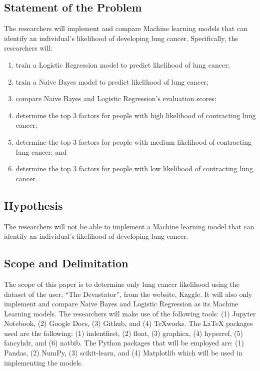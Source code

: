 \documentclass[runningheads]{llncs}
\begin{document}
\subsection{Statement of the Problem}
The researchers will implement and compare Machine learning models that can identify an individual’s likelihood of developing lung cancer. Specifically, the researchers will:
\begin{enumerate}
	\item train a Logistic Regression model to predict likelihood of lung cancer;
	\item train a Naive Bayes model to predict likelihood of lung cancer;
	\item compare Naive Bayes and Logistic Regression’s evaluation scores;
	\item determine the top 3 factors for people with high likelihood of contracting lung cancer; 
	\item determine the top 3 factors for people with medium likelihood of contracting lung cancer; and
	\item determine the top 3 factors for people with low likelihood of contracting lung cancer.
\end{enumerate}

\subsection{Hypothesis}
The researchers will not be able to implement a Machine learning model that can identify an individual’s likelihood of developing lung cancer.

\subsection{Scope and Delimitation}
The scope of this paper is to determine only lung cancer likelihood using the dataset of the user, “The Devastator”, from the website, Kaggle. It will also only implement and compare Naive Bayes and Logistic Regression as its Machine Learning models. The researchers will make use of the following tools: (1) Jupyter Notebook, (2) Google Docs, (3) Github, and (4) TeXworks. The LaTeX packages used are the following: (1) indentfirst, (2) float, (3) graphicx, (4) hyperref, (5) fancyhdr, and (6) natbib. The Python packages that will be employed are: (1) Pandas, (2) NumPy, (3) scikit-learn, and (4) Matplotlib which will be used in implementing the models.
\end{document}
